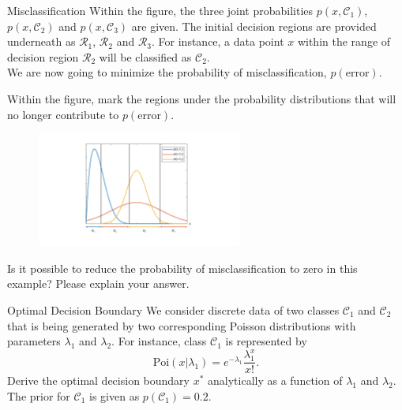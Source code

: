 \documentclass[
	ngerman,
	points=true,%
    solution=true,
    accentcolor=9c,
    colorbacktitle
	]{tudaexercise}
\begin{document}
\begin{task}{Misclassification}
Within the figure, the three joint probabilities $p(x, \mathcal{C}_1)$, $p(x, \mathcal{C}_2)$ and $p(x, \mathcal{C}_3)$ are given. The initial decision regions are provided underneath as $\mathcal{R}_1$, $\mathcal{R}_2$ and $\mathcal{R}_3$. For instance, a data point $x$ within the range of decision region $\mathcal{R}_2$ will be classified as $\mathcal{C}_2$. \\
We are now going to minimize the probability of misclassification, $p(\text{error})$.    
\end{task}
\begin{subtask}
Within the figure, mark the regions under the probability distributions that will no longer contribute to $p(\text{error})$.
\begin{figure}[h]
  \centering
  \includegraphics[width=0.6\textwidth]{misclassification.pdf}
  \label{fig:example}
\end{figure} 
\end{subtask}
\begin{subtask}
Is it possible to reduce the probability of misclassification to zero in this example? Please explain your answer.
\end{subtask}
\begin{solution}
\end{solution}

\begin{task}{Optimal Decision Boundary}
We consider discrete data of two classes $\mathcal{C}_1$ and $\mathcal{C}_2$ that is being generated by two corresponding Poisson distributions with parameters $\lambda_1$ and $\lambda_2$. For instance, class $\mathcal{C}_1$ is represented by 
\begin{equation*}
    \text{Poi}(x|\lambda_1)=e^{-\lambda_1}\frac{\lambda_1^{x}}{x!}.
\end{equation*}
Derive the optimal decision boundary $x^{*}$ analytically as a function of $\lambda_1$ and $\lambda_2$. The prior for $\mathcal{C}_1$ is given as $p(\mathcal{C}_1)=0.2$.
\end{task}
\begin{solution}
    
\end{solution}
\end{document}
